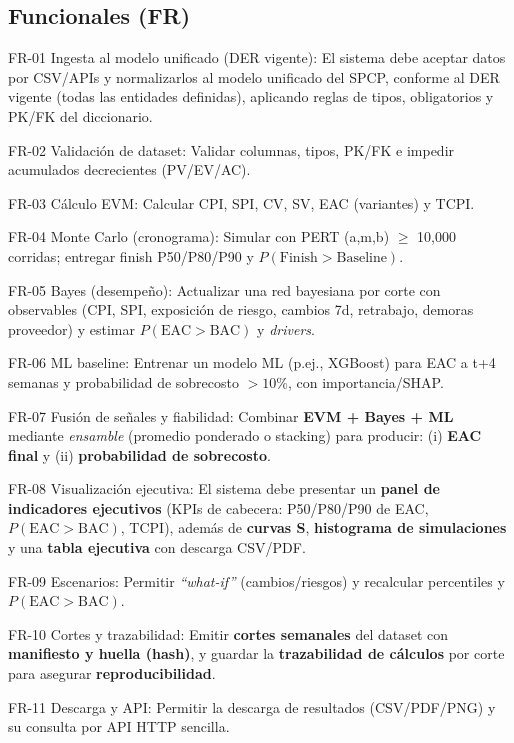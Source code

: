 \documentclass[12pt]
{charter}
\begin{document}
\subsection{Funcionales (FR)}
\begin{description}
  \item FR-01 Ingesta al modelo unificado (DER vigente): El sistema debe aceptar datos por CSV/APIs y normalizarlos al modelo unificado del SPCP, conforme al DER vigente (todas las entidades definidas), aplicando reglas de tipos, obligatorios y PK/FK del diccionario.

  \item FR-02 Validación de dataset: Validar columnas, tipos, PK/FK e impedir acumulados decrecientes (PV/EV/AC).

  \item FR-03 Cálculo EVM: Calcular CPI, SPI, CV, SV, EAC (variantes) y TCPI.

  \item FR-04 Monte Carlo (cronograma): Simular con PERT (a,m,b) $\geq$ 10{,}000 corridas; entregar finish P50/P80/P90 y $P(\text{Finish}>\text{Baseline})$.

  \item FR-05 Bayes (desempeño): Actualizar una red bayesiana por corte con observables (CPI, SPI, exposición de riesgo, cambios 7d, retrabajo, demoras proveedor) y estimar $P(\text{EAC}>\text{BAC})$ y \textit{drivers}.

  \item FR-06 ML baseline: Entrenar un modelo ML (p.ej., XGBoost) para EAC a t+4 semanas y probabilidad de sobrecosto $>10\%$, con importancia/SHAP.

  \item FR-07 Fusión de señales y fiabilidad: Combinar \textbf{EVM + Bayes + ML} mediante \textit{ensamble} (promedio ponderado o stacking) para producir: (i) \textbf{EAC final} y (ii) \textbf{probabilidad de sobrecosto}. 

  \item FR-08 Visualización ejecutiva: El sistema debe presentar un \textbf{panel de indicadores ejecutivos} (KPIs de cabecera: P50/P80/P90 de EAC, $P(\text{EAC}>\text{BAC})$, TCPI), además de \textbf{curvas S}, \textbf{histograma de simulaciones} y una \textbf{tabla ejecutiva} con descarga CSV/PDF.

  \item FR-09 Escenarios: Permitir \textit{“what-if”} (cambios/riesgos) y recalcular percentiles y $P(\text{EAC}>\text{BAC})$.

  \item FR-10 Cortes y trazabilidad: Emitir \textbf{cortes semanales} del dataset con \textbf{manifiesto y huella (hash)}, y guardar la \textbf{trazabilidad de cálculos} por corte para asegurar \textbf{reproducibilidad}.

  \item FR-11 Descarga y API: Permitir la descarga de resultados (CSV/PDF/PNG) y su consulta por API HTTP sencilla.

\end{description}
\end{document}
